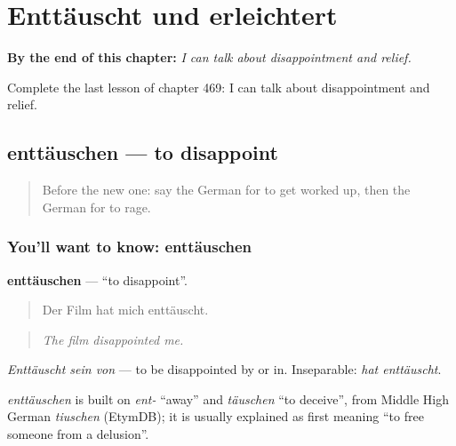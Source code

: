 
\chapter{Enttäuscht und erleichtert}
\label{ch:ge-enttauscht-und-erleichtert}

\begin{chapteropening}
\textbf{By the end of this chapter:} \emph{I can talk about disappointment and relief.}

Complete the last lesson of chapter 469: I can talk about disappointment and relief.
\end{chapteropening}

\section[enttäuschen]{enttäuschen — to disappoint}

\label{lesson:GE-C469-enttaeuschen}



\begin{quote}
Before the new one: say the German for to get worked up, then the German for to rage.
\end{quote}

\subsection*{You'll want to know: enttäuschen}
\textbf{enttäuschen} — \textquotedblleft{}to disappoint\textquotedblright{}.

\begin{quote}
Der Film hat mich enttäuscht.
\end{quote}

\begin{quote}
\emph{The film disappointed me.}
\end{quote}

\emph{Enttäuscht sein von} — to be disappointed by or in. Inseparable: \emph{hat enttäuscht}.

\begin{cousinweb}
\emph{enttäuschen} is built on \emph{ent-} \textquotedblleft{}away\textquotedblright{} and \emph{täuschen} \textquotedblleft{}to deceive\textquotedblright{}, from Middle High German \emph{tiuschen} (EtymDB); it is usually explained as first meaning \textquotedblleft{}to free someone from a delusion\textquotedblright{}.
\end{cousinweb}

